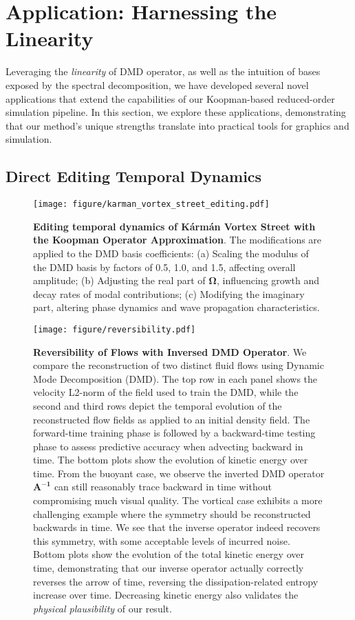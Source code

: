 \section{Application: Harnessing the Linearity}
\label{sec:application}
Leveraging the \emph{linearity} of DMD operator, as well as the intuition of bases exposed by the spectral decomposition, we have developed several novel applications that extend the capabilities of our Koopman-based reduced-order simulation pipeline. In this section, we explore these applications, demonstrating that our method's unique strengths translate into practical tools for graphics and simulation.

\subsection{Direct Editing Temporal Dynamics}
\label{sec:editing}
\begin{figure}[!ht]
    \centering
    \texttt{[image: figure/karman\_vortex\_street\_editing.pdf]}
    \caption{\textbf{Editing temporal dynamics of K\'arm\'an Vortex Street with the Koopman Operator Approximation}. The modifications are applied to the DMD basis coefficients: (a) Scaling the modulus of the DMD basis by factors of 0.5, 1.0, and 1.5, affecting overall amplitude; (b) Adjusting the real part of $\bm{\Omega}$, influencing growth and decay rates of modal contributions; (c) Modifying the imaginary part, altering phase dynamics and wave propagation characteristics. }
    \label{fig:karman_editing}
    \Description{}
\end{figure}


\begin{figure*}[!ht]
    \centering
    \texttt{[image: figure/reversibility.pdf]}
    \caption{\textbf{Reversibility of Flows with Inversed DMD Operator}. We compare the reconstruction of two distinct fluid flows using Dynamic Mode Decomposition (DMD). The top row in each panel shows the velocity L2-norm of the field used to train the DMD, while the second and third rows depict the temporal evolution of the reconstructed flow fields as applied to an initial density field. The forward-time training phase is followed by a backward-time testing phase to assess predictive accuracy when advecting backward in time. The bottom plots show the evolution of kinetic energy over time. From the buoyant case, we observe the inverted DMD operator $\bm{A^{-1}}$ can still reasonably trace backward in time without compromising much visual quality. The vortical case exhibits a more challenging example where the symmetry should be reconstructed backwards in time. We see that the inverse operator indeed recovers this symmetry, with some acceptable levels of incurred noise. Bottom plots show the evolution of the total kinetic energy over time, demonstrating that our inverse operator actually correctly reverses the arrow of time, reversing the dissipation-related entropy increase over time. Decreasing kinetic energy also validates the \emph{physical plausibility} of our result.}
    \label{fig:reverse_simulation}
    \Description{}
\end{figure*}


